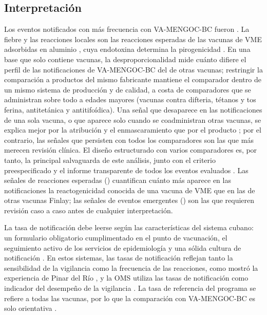 \documentclass[11pt]{article}
\begin{document}
\subsection{Interpretación}\label{sec:d-interpretation}
Los eventos notificados con más frecuencia con VA-MENGOC-BC fueron \POTopEvents. La fiebre y las
reacciones locales son las reacciones esperadas de las vacunas de VME adsorbidas en aluminio
\cite{Nokleby2007,Holst2009}, cuya endotoxina determina la pirogenicidad
\cite{Sheerin2019,Rosenqvist1998}. En una base que solo contiene vacunas, la desproporcionalidad
mide cuánto difiere el perfil de las notificaciones de VA-MENGOC-BC del de otras vacunas; restringir
la comparación a productos del mismo fabricante mantiene el comparador dentro de un mismo sistema
de producción y de calidad, a costa de comparadores que se administran sobre todo a edades mayores
(vacunas contra difteria, tétanos y tos ferina, antitetánica y antitifoídica). Una señal que
desaparece en las notificaciones de una sola vacuna, o que aparece solo cuando se coadministran
otras vacunas, se explica mejor por la atribución y el enmascaramiento que por el producto
\cite{Maignen2014,Salvo2013}; por el contrario, las señales que persisten con todos los comparadores
son las que más merecen revisión clínica. El diseño estructurado con varios comparadores es, por
tanto, la principal salvaguarda de este análisis, junto con el criterio preespecificado y el informe
transparente de todos los eventos evaluados \cite{Fusaroli2024Elaboration,Fusaroli2026Pitfalls}.
Las señales de reacciones esperadas (\POSignalExpectedList) cuantifican cuánto más aparece en las
notificaciones la reactogenicidad conocida de una vacuna de VME que en las de otras vacunas Finlay; las
señales de eventos emergentes (\POSignalEmergingList) son las que requieren revisión caso a caso
antes de cualquier interpretación.

La tasa de notificación debe leerse según las características del sistema cubano: un formulario
obligatorio cumplimentado en el punto de vacunación, el seguimiento activo de los servicios de
epidemiología y una sólida cultura de notificación \cite{Galindo2012,Reed2007}. En estos sistemas,
las tasas de notificación reflejan tanto la sensibilidad de la vigilancia como la frecuencia de las
reacciones, como mostró la experiencia de Pinar del Río \cite{CruzRodriguez2021}, y la OMS utiliza
las tasas de notificación como indicador del desempeño de la vigilancia \cite{Lei2018}. La tasa de
referencia del programa se refiere a todas las vacunas, por lo que la comparación con VA-MENGOC-BC es
solo orientativa \cite{Mahaux2016}.
\end{document}
